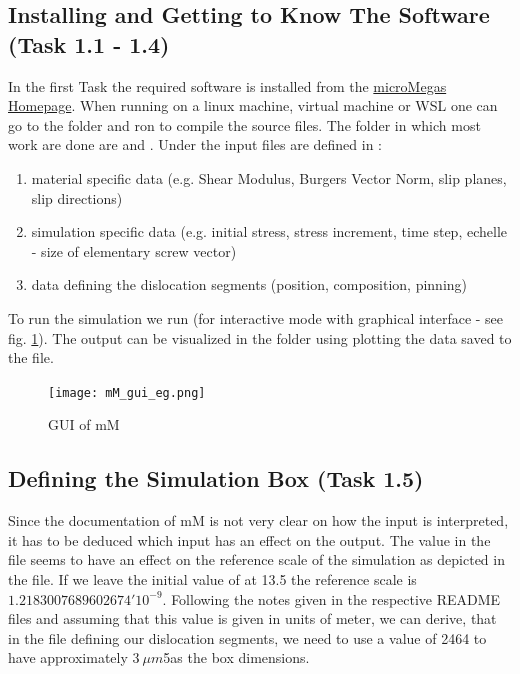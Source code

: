 \subsection{Installing and Getting to Know The Software (Task 1.1 - 1.4)}
In the first Task the required software is installed from the \href{http://zig.onera.fr/mm_home_page/}{microMegas Homepage}. When running on a linux machine, virtual machine or WSL one can go to the  folder and ron  to compile the source files. The folder in which most work are done are  and . Under  the input files are defined in :

\begin{enumerate}
	\item material specific data (e.g. Shear Modulus, Burgers Vector Norm, slip planes, slip directions)
	\item simulation specific data (e.g. initial stress, stress increment, time step, echelle - size of elementary screw vector)
	\item data defining the dislocation segments (position, composition, pinning)
\end{enumerate}

To run the simulation we run (for interactive mode with graphical interface - see fig. \ref{fig:mm_gui}). The output can be visualized in the  folder using plotting the data saved to the  file.

\begin{figure}[htb]
	\centering
	\texttt{[image: mM\_gui\_eg.png]}
	\caption{GUI of mM}
	\label{fig:mm_gui}
\end{figure}

\subsection{Defining the Simulation Box (Task 1.5)}

Since the documentation of mM is not very clear on how the input is interpreted, it has to be deduced which input has an effect on the output. The  value in the  file seems to have an effect on the reference scale of the simulation as depicted in the  file. If we leave the initial value of  at 13.5 the reference scale is \(1.2183007689602674'10^{-9}\). Following the notes given in the respective README files and assuming that this value is given in units of meter, we can derive, that in the file defining our dislocation segments, we need to use a value of 2464 to have approximately \(3~\mu m\)5as the box dimensions.

